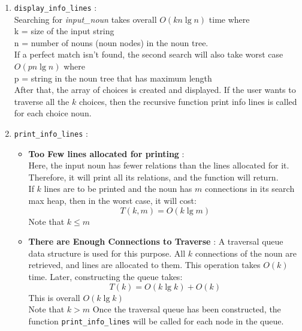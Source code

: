 \documentclass[conference]{IEEEtran}
\begin{document}
\begin{enumerate}
    \item \texttt{display\_info\_lines} :
    \\Searching for \textit{input\_noun} takes overall $O(kn \lg n)$  time where 
    \\k = size of the input string
    \\n = number of nouns (noun nodes) in the noun tree.
    \\If a perfect match isn’t found, the second search will also
take worst case  $O(pn \lg n)$ where
    \\p = string in the noun tree that has maximum length
    \\After that, the array of choices is created and displayed. If
the user wants to traverse all the $k$ choices, then the recursive
function print info lines is called for each choice noun.
    \item \texttt{print\_info\_lines} :
    \begin{itemize}
        \item \textbf{Too Few lines allocated for printing} :
        \\Here, the input noun has fewer relations than the lines
allocated for it. Therefore, it will print all its relations,
and the function will return. 
\\If $k$ lines are to be printed
and the noun has $m$ connections in its search max heap,
then in the worst case, it will cost:
\begin{equation}
	T(k, m) = O(k\lg m)
\end{equation}
Note that $k \leq m$
\item \textbf{There are Enough Connections to Traverse} : 
A traversal queue data structure is used for this purpose.
All $k$ connections of the noun are retrieved, and lines are
allocated to them. This operation takes $O(k)$ time. Later,
constructing the queue takes:
\begin{equation}
    T(k) = O(k\lg k) + O(k)
\end{equation}
This is overall $O(k\lg k)$
\\Note that $k > m$
Once the traversal queue has been constructed, the function \texttt{print\_info\_lines} will be called for each node
in the queue.


\end{itemize}
\end{enumerate}
\end{document}
